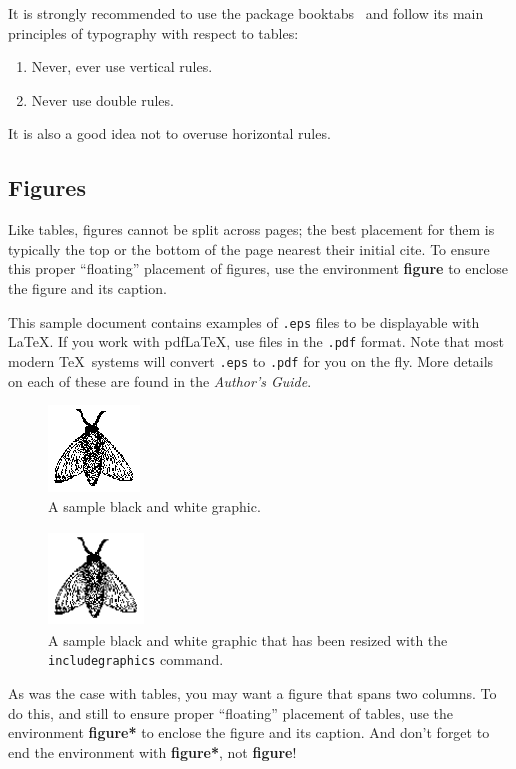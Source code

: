 It is strongly recommended to use the package booktabs~\cite{Fear05}
and follow its main principles of typography with respect to tables:
\begin{enumerate}
	\item Never, ever use vertical rules.
	\item Never use double rules.
\end{enumerate}
It is also a good idea not to overuse horizontal rules.


\subsection{Figures}

Like tables, figures cannot be split across pages; the best placement
for them is typically the top or the bottom of the page nearest their
initial cite.  To ensure this proper ``floating'' placement of
figures, use the environment \textbf{figure} to enclose the figure and
its caption.

This sample document contains examples of \texttt{.eps} files to be
displayable with \LaTeX.  If you work with pdf\LaTeX, use files in the
\texttt{.pdf} format.  Note that most modern \TeX\ systems will convert
\texttt{.eps} to \texttt{.pdf} for you on the fly.  More details on
each of these are found in the \textit{Author's Guide}.

\begin{figure}
	\includegraphics{fly}
	\caption{A sample black and white graphic.}
\end{figure}

\begin{figure}
	\includegraphics[height=1in, width=1in]{fly}
	\caption{A sample black and white graphic
		that has been resized with the \texttt{includegraphics} command.}
\end{figure}


As was the case with tables, you may want a figure that spans two
columns.  To do this, and still to ensure proper ``floating''
placement of tables, use the environment \textbf{figure*} to enclose
the figure and its caption.  And don't forget to end the environment
with \textbf{figure*}, not \textbf{figure}!

